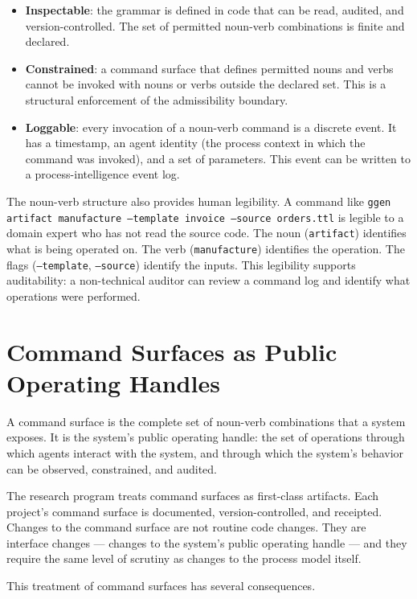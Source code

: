 \begin{itemize}
  \item \textbf{Inspectable}: the grammar is defined in code that can be read, audited, and version-controlled. The set of permitted noun-verb combinations is finite and declared.
  \item \textbf{Constrained}: a command surface that defines permitted nouns and verbs cannot be invoked with nouns or verbs outside the declared set. This is a structural enforcement of the admissibility boundary.
  \item \textbf{Loggable}: every invocation of a noun-verb command is a discrete event. It has a timestamp, an agent identity (the process context in which the command was invoked), and a set of parameters. This event can be written to a process-intelligence event log.
\end{itemize}

The noun-verb structure also provides human legibility. A command like \texttt{ggen artifact manufacture --template invoice --source orders.ttl} is legible to a domain expert who has not read the source code. The noun (\texttt{artifact}) identifies what is being operated on. The verb (\texttt{manufacture}) identifies the operation. The flags (\texttt{--template}, \texttt{--source}) identify the inputs. This legibility supports auditability: a non-technical auditor can review a command log and identify what operations were performed.

\section{Command Surfaces as Public Operating Handles}

A command surface is the complete set of noun-verb combinations that a system exposes. It is the system's public operating handle: the set of operations through which agents interact with the system, and through which the system's behavior can be observed, constrained, and audited.

The research program treats command surfaces as first-class artifacts. Each project's command surface is documented, version-controlled, and receipted. Changes to the command surface are not routine code changes. They are interface changes --- changes to the system's public operating handle --- and they require the same level of scrutiny as changes to the process model itself.

This treatment of command surfaces has several consequences.

